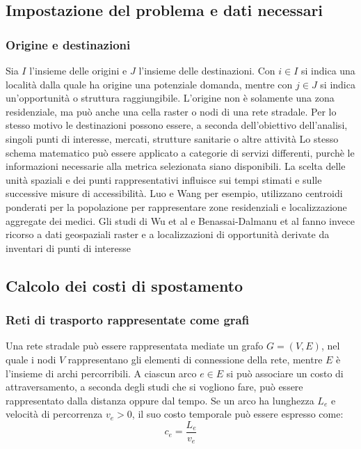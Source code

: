 \subsection{Impostazione del problema e dati necessari}

\subsubsection{Origine e destinazioni}

Sia $I$ l'insieme delle origini e $J$ l'insieme delle destinazioni. Con $i\in I$ si indica una località dalla quale ha origine una potenziale domanda, mentre con $j\in J$ si indica un'opportunità o struttura raggiungibile.
L'origine non è solamente una zona residenziale, ma può anche una cella raster o nodi di una rete stradale. Per lo stesso motivo le destinazioni possono essere, a seconda dell'obiettivo dell'analisi, singoli punti di interesse, mercati, strutture sanitarie o altre attività \cite{luo2003,tariverdi2023,wu2025,benassai2026}
Lo stesso schema matematico può essere applicato a categorie di servizi differenti, purchè le informazioni necessarie alla metrica selezionata siano disponibili.
La scelta delle unità spaziali e dei punti rappresentativi influisce sui tempi stimati e sulle successive misure di accessibilità. Luo e Wang per esempio, utilizzano centroidi ponderati per la popolazione per rappresentare zone residenziali e localizzazione aggregate dei medici.
Gli studi di Wu et al e Benassai-Dalmanu et al fanno invece ricorso a dati geospaziali raster e a localizzazioni di opportunità derivate da inventari di punti di interesse \cite{luo2003,wu2025,benassai2026}

\subsection{Calcolo dei costi di spostamento}

\subsubsection{Reti di trasporto rappresentate come grafi}
Una rete stradale può essere rappresentata mediate un grafo $G= (V,E)$, nel quale i nodi $V$ rappresentano gli elementi di connessione della rete, mentre $E$ è l'insieme di archi percorribili. A ciascun arco $e\in E$ si può associare un costo di attraversamento, a seconda degli studi che si vogliono fare, può essere rappresentato dalla distanza oppure dal tempo.
Se un arco ha lunghezza $L_e$ e velocità di percorrenza $v_e>0$, il suo costo temporale può essere espresso come: 
\begin{equation}
    c_e =\frac{L_e}{v_e}
\end{equation}

